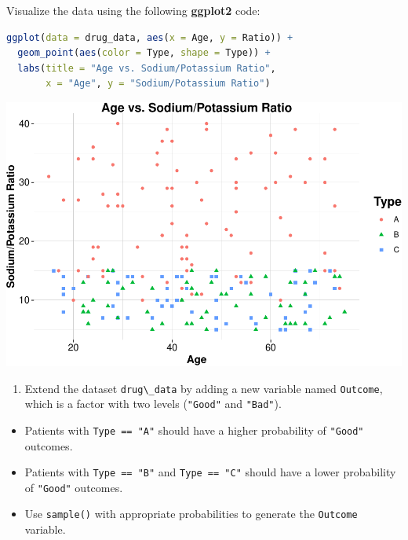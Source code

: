 \documentclass[
]{book}
\newcommand{\passthrough}[1]{#1}
\providecommand{\tightlist}{%
  \setlength{\itemsep}{0pt}\setlength{\parskip}{0pt}}
\theoremstyle{definition}
\theoremstyle{definition}
\theoremstyle{definition}
\theoremstyle{definition}
\theoremstyle{remark}
\begin{document}
Visualize the data using the following \textbf{ggplot2} code:

\begin{lstlisting}[language=R]
ggplot(data = drug_data, aes(x = Age, y = Ratio)) +
  geom_point(aes(color = Type, shape = Type)) + 
  labs(title = "Age vs. Sodium/Potassium Ratio", 
       x = "Age", y = "Sodium/Potassium Ratio")
\end{lstlisting}

\begin{center}\includegraphics[width=0.7\linewidth]{Intro-R_files/figure-latex/unnamed-chunk-45-1} \end{center}

\begin{enumerate}
\def\labelenumi{\arabic{enumi}.}
\setcounter{enumi}{17}
\tightlist
\item
  Extend the dataset \passthrough{\lstinline!drug\_data!} by adding a new variable named \passthrough{\lstinline!Outcome!}, which is a factor with two levels (\passthrough{\lstinline!"Good"!} and \passthrough{\lstinline!"Bad"!}).\\
\end{enumerate}

\begin{itemize}
\tightlist
\item
  Patients with \passthrough{\lstinline!Type == "A"!} should have a higher probability of \passthrough{\lstinline!"Good"!} outcomes.\\
\item
  Patients with \passthrough{\lstinline!Type == "B"!} and \passthrough{\lstinline!Type == "C"!} should have a lower probability of \passthrough{\lstinline!"Good"!} outcomes.\\
\item
  Use \passthrough{\lstinline!sample()!} with appropriate probabilities to generate the \passthrough{\lstinline!Outcome!} variable.\\
\end{itemize}
\end{document}
